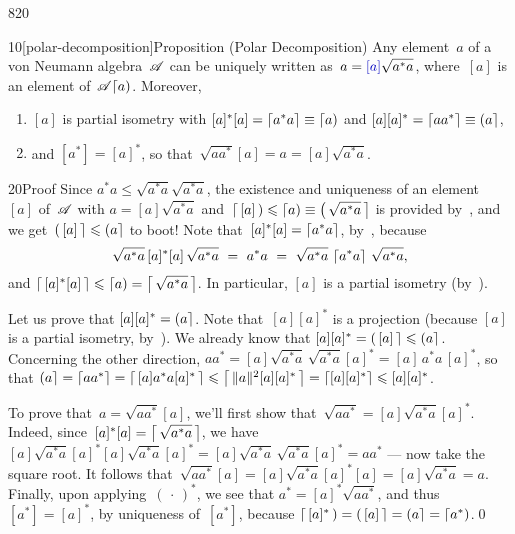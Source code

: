 \begin{parsec}{820}%
\begin{point}{10}[polar-decomposition]{Proposition (Polar Decomposition)}%
%
Any element~$a$ of a von Neumann
algebra~$\mathscr{A}$
can be uniquely written as~$a=\Define{[a]}\sqrt{a^*a}$,%
where~$[a]$
is an element of~$\mathscr{A}\!\left\lceil a\right)$.
Moreover,
\begin{enumerate}
\item
$[a]$ is partial isometry
with $[a]^*[a] = \left\lceil a^*a\right\rceil \equiv \left\lceil a\right)$
and $[a][a]^*=\left\lceil aa^*\right\rceil \equiv \left(a\right\rceil$,
\item
and $[a^*]=[a]^*$, so that~$\sqrt{aa^*}[a]=a=[a]\sqrt{a^*a}$.
\end{enumerate}
\begin{point}{20}{Proof}%
Since $a^*a\leq \sqrt{a^*a}\sqrt{a^*a}$,
the existence and uniqueness
of an element~$[a]$ of~$\mathscr{A}$
with $a=[a]\sqrt{a^*a}$
and~$\left\lceil\,[a]\,\right)\leqslant
\left\lceil a\right)\equiv \left(\,\sqrt{a^*a}\,\right\rceil$
is provided by~,
and we get~$\left(\,[a]\,\right\rceil\leqslant \left(a\right\rceil$
to boot!
Note that~$[a]^*[a]=\left\lceil a^*a\right\rceil$,
by~,
because 
\begin{equation*}
	\sqrt{a^*a}\,[a]^*[a]\,\sqrt{a^*a}
\ =\ 
a^*a
\ =\ 
\sqrt{a^*a}\,\ceil{a^*a}\,\sqrt{a^*a},
\end{equation*}
and $\left\lceil\,[a]^*[a]\,\right\rceil\leqslant \left\lceil a\right)=\left\lceil\,\sqrt{a^*a}\,\right\rceil$.
In particular, $[a]$ is a partial isometry
(by~\sref{partial-isometry-equivalents}).

Let us prove that $[a][a]^*=\left(a\right\rceil$.
Note that~$[a][a]^*$
is a projection (because $[a]$ is a partial isometry, 
by~).
We already know that $[a][a]^* = \left(\,[a]\,\right\rceil\leqslant \left(a\right\rceil$.
Concerning the other direction,
$aa^*=[a]\sqrt{a^*a}\,\sqrt{a^*a}[a]^*=[a]\,a^*a\,[a]^*$,
so that
$\left(a\right\rceil=\left\lceil aa^*\right\rceil
= \left\lceil\,[a]a^*a[a]^*\,\right\rceil
\leqslant \left\lceil\,\|a\|^2[a][a]^*\,\right\rceil
	=\left\lceil[a][a]^*\right\rceil
\leqslant [a][a]^*$.

To prove that~$a=\sqrt{aa^*}[a]$,
we'll first show that~$\sqrt{aa^*} = [a] \sqrt{a^*a} [a]^*$.
Indeed, since~$[a]^*[a]=\left\lceil\,\sqrt{a^*a}\,\right\rceil$,
we have
$[a]\sqrt{a^*a}[a]^*[a]\sqrt{a^*a}[a]^*
= [a] \sqrt{a^*a} \,\sqrt{a^*a} [a]^* 
= aa^*$ --- now take the square root.
It follows that~$\sqrt{aa^*}[a]
= [a]\sqrt{a^*a}[a]^*[a]
= [a]\sqrt{a^*a}=a$.
Finally, upon applying~$(\,\cdot\,)^*$,
we see that
$a^*=[a]^*\sqrt{aa^*}$,
and thus~$[a^*]=[a]^*$,
by uniqueness of~$[a^*]$,
because $\left\lceil\,[a]^*\,\right)=\left(\,[a]\,\right\rceil=  \left(a\right\rceil
=\left\lceil a^*\right)$.\qed
\end{point}
\end{point}
\end{parsec}
